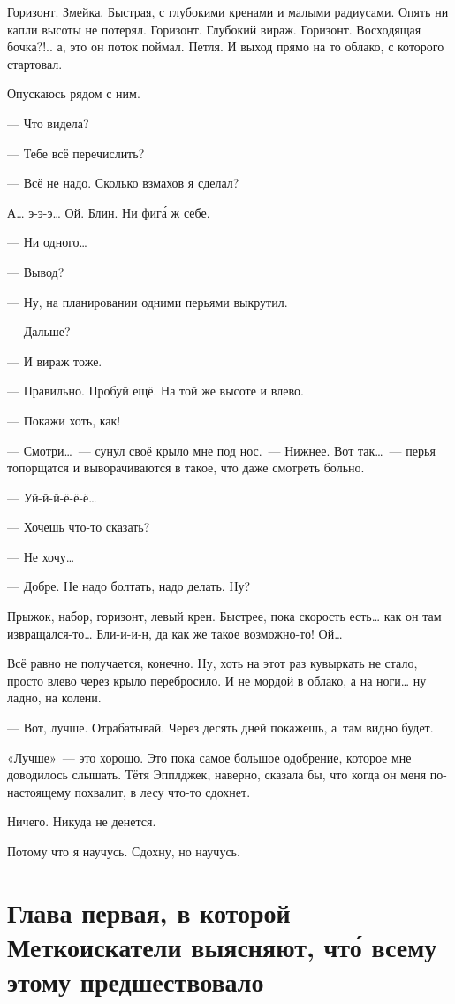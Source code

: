 \documentclass[fontsize=11pt,a5paper,titlepage=firstcover]{scrbook}
\begin{document}
Горизонт. Змейка. Быстрая, с глубокими кренами и малыми радиусами. Опять ни капли высоты не потерял. Горизонт. Глубокий вираж. Горизонт. Восходящая бочка?!.. а, это он поток поймал. Петля. И выход прямо на то облако, с которого стартовал.

Опускаюсь рядом с ним.

--- Что видела?

--- Тебе всё перечислить?

--- Всё не надо. Сколько взмахов я сделал?

А{\ldots} э-э-э{\ldots} Ой. Блин. Ни фига́ ж себе.

--- Ни одного{\ldots}

--- Вывод?

--- Ну, на планировании одними перьями выкрутил.

--- Дальше?

--- И вираж тоже.

--- Правильно. Пробуй ещё. На той же высоте и влево.

--- Покажи хоть, как!

--- Смотри{\ldots}~--- сунул своё крыло мне под нос.~--- Нижнее. Вот так{\ldots}~--- перья топорщатся и выворачиваются в такое, что даже смотреть больно.

--- Уй-й-й-ё-ё-ё{\ldots}

--- Хочешь что-то сказать?

--- Не хочу{\ldots}

--- Добре. Не надо болтать, надо делать. Ну?

Прыжок, набор, горизонт, левый крен. Быстрее, пока скорость есть{\ldots} как он там извращался-то{\ldots} Бли-и-и-н, да как же такое возможно-то! Ой{\ldots}

Всё равно не получается, конечно. Ну, хоть на этот раз кувыркать не стало, просто влево через крыло перебросило. И не мордой в облако, а на ноги{\ldots} ну ладно, на колени.

--- Вот, лучше. Отрабатывай. Через десять дней покажешь, а~там видно будет.

«Лучше»~--- это хорошо. Это пока самое большое одобрение, которое мне доводилось слышать. Тётя Эпплджек, наверно, сказала бы, что когда он меня по-настоящему похвалит, в лесу что-то сдохнет.

Ничего. Никуда не денется.

Потому что я научусь. Сдохну, но научусь.


\chapter*{Глава первая, в которой Меткоискатели выясняют, чт\'о всему этому предшествовало}
\end{document}
